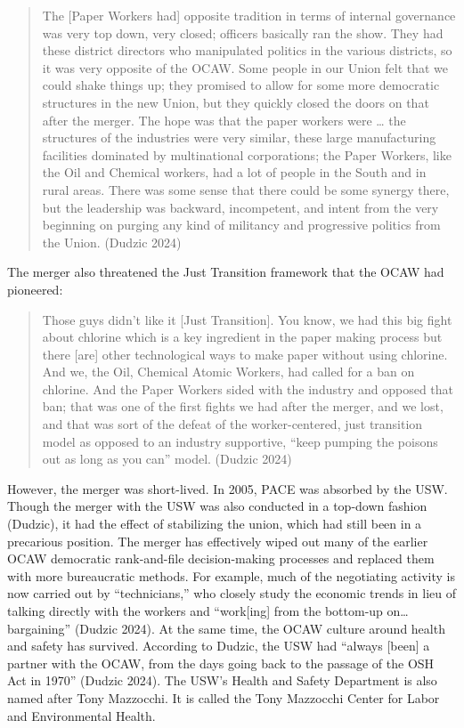 \begin{quote}
The [Paper Workers had] opposite tradition in terms of internal governance was very top down, very closed; officers basically ran the show. They had these district directors who manipulated politics in the various districts, so it was very opposite of the OCAW. Some people in our Union felt that we could shake things up; they promised to allow for some more democratic structures in the new Union, but they quickly closed the doors on that after the merger. The hope was that the paper workers were … the structures of the industries were very similar, these large manufacturing facilities dominated by multinational corporations; the Paper Workers, like the Oil and Chemical workers, had a lot of people in the South and in rural areas. There was some sense that there could be some synergy there, but the leadership was backward, incompetent, and intent from the very beginning on purging any kind of militancy and progressive politics from the Union. (Dudzic 2024)
\end{quote}

The merger also threatened the Just Transition framework that the OCAW had pioneered:

\begin{quote}
Those guys didn't like it [Just Transition]. You know, we had this big fight about chlorine which is a key ingredient in the paper making process but there [are] other technological ways to make paper without using chlorine. And we, the Oil, Chemical Atomic Workers, had called for a ban on chlorine. And the Paper Workers sided with the industry and opposed that ban; that was one of the first fights we had after the merger, and we lost, and that was sort of the defeat of the worker-centered, just transition model as opposed to an industry supportive, “keep pumping the poisons out as long as you can” model. (Dudzic 2024)
\end{quote}

However, the merger was short-lived. In 2005, PACE was absorbed by the USW. Though the merger with the USW was also conducted in a top-down fashion (Dudzic), it had the effect of stabilizing the union, which had still been in a precarious position. The merger has effectively wiped out many of the earlier OCAW democratic rank-and-file decision-making processes and replaced them with more bureaucratic methods. For example, much of the negotiating activity is now carried out by “technicians,” who closely study the economic trends in lieu of talking directly with the workers and “work[ing] from the bottom-up on…bargaining” (Dudzic 2024). At the same time, the OCAW culture around health and safety has survived. According to Dudzic, the USW had “always [been] a partner with the OCAW, from the days going back to the passage of the OSH Act in 1970” (Dudzic 2024). The USW’s Health and Safety Department is also named after Tony Mazzocchi. It is called the Tony Mazzocchi Center for Labor and Environmental Health.

